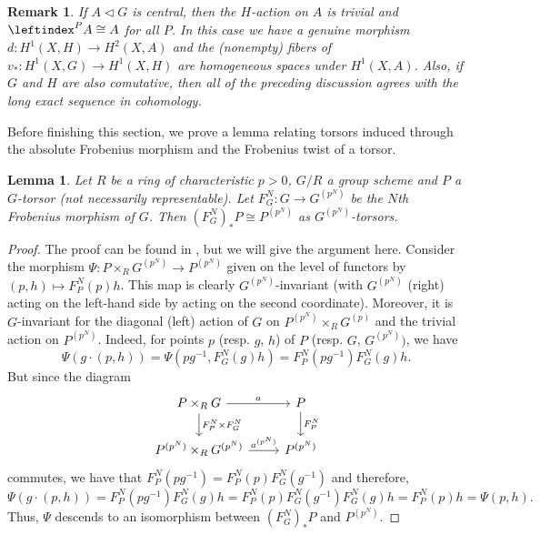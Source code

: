 \documentclass[a4paper,english,12pt]{amsart}
\newtheorem{lemma}[definition]{Lemma}
\newtheorem{remark}[definition]{Remark}
\numberwithin{equation}{section}
\renewcommand{\_}{\rule{0.25cm}{0.4pt}}
\begin{document}
\begin{remark}
If $A\triangleleft G$ is central, then the $H$-action on $A$ is trivial and $\leftindex^{P}{A}\cong A$ for all $P$. In this case we have a genuine morphism $d\colon H^{1}(X,H)\to H^2(X,A)$ and the (nonempty) fibers of $v_{\ast}\colon H^{1}(X,G)\to H^{1}(X,H)$ are homogeneous spaces under $H^1(X,A)$. Also, if $G$ and $H$ are also comutative, then all of the preceding discussion agrees with the long exact sequence in cohomology.
\end{remark}

Before finishing this section, we prove a lemma relating torsors induced through the absolute Frobenius morphism and the Frobenius twist of a torsor.

\begin{lemma}\label{twist e frobenius}
    Let $R$ be a ring of characteristic $p>0$, $G/R$ a group scheme and $P$ a $G$-torsor (not necessarily representable). Let $F^{N}_{G}\colon G\to G^{(p^{N})}$ be the $N$th Frobenius morphism of $G$. Then $(F^{N}_{G})_{\ast}P\cong P^{(p^{N})}$ as $G^{(p^{N})}$-torsors.
\end{lemma}
\begin{proof}
    The proof can be found in \cite[Lemma 3.1]{Florence_2013}, but we will give the argument here. Consider the morphism $\Psi\colon P\times_{R} G^{(p^{N})}\to P^{(p^{N})}$ given on the level of functors by $(p,h)\mapsto F^{N}_{P}(p)h$. This map is clearly $G^{(p^{N})}$-invariant (with $G^{(p^{N})}$ (right) acting on the left-hand side by acting on the second coordinate). Moreover, it is $G$-invariant for the diagonal (left) action of $G$ on $P^{(p^{N})}\times_{R} G^{(p)}$ and the trivial action on $P^{(p^{N})}$. Indeed, for points $p$ (resp. $g$, $h$) of $P$ (resp. $G$, $G^{(p^{N})})$, we have
    \[
    \Psi(g\cdot (p,h))=\Psi(pg^{-1},F_{G}^{N}(g)h)=F^{N}_{P}(pg^{-1})F^{N}_{G}(g)h.
    \]
    But since the diagram
    \[
    \begin{tikzcd}
        P\times_{R} G \ar[r, "a"]\ar[d, "F_{P}^{N}\times F_{G}^{N}"] & P\ar[d, "F_{P}^{N}"]
        \\
        P^{(p^{N})}\times_{R} G^{(p^{N})} \ar[r, "a^{(p^{N})}"] & P^{(p^{N})}
    \end{tikzcd}
    \]
    commutes, we have that $F^{N}_{P}(pg^{-1})=F^{N}_{P}(p)F^{N}_{G}(g^{-1})$ and therefore,
    \[
    \Psi(g\cdot (p,h))=F^{N}_{P}(pg^{-1})F^{N}_{G}(g)h=F^{N}_{P}(p)F^{N}_{G}(g^{-1})F^{N}_{G}(g)h=F^{N}_{P}(p)h=\Psi(p,h).
    \]
    Thus, $\Psi$ descends to an isomorphism between $(F^{N}_{G})_{\ast}P$ and $P^{(p^{N})}$.
\end{proof}
\end{document}
